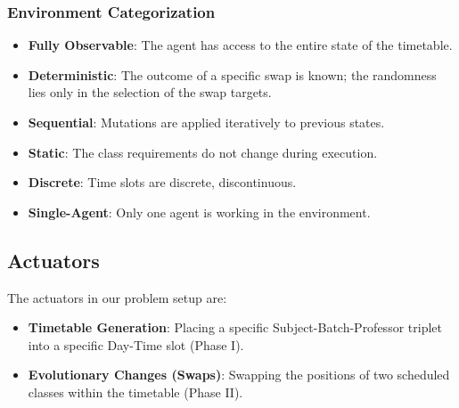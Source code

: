\documentclass[a4paper,twoside,11pt]{article}
\begin{document}
            \subsubsection{Environment Categorization}

                \begin{itemize}
                    \itemsep0em
                    \item \textbf{Fully Observable}: The agent has access to the entire state of the timetable.
                    \item \textbf{Deterministic}: The outcome of a specific swap is known; the randomness lies only in the selection of the swap targets.
                    \item \textbf{Sequential}: Mutations are applied iteratively to previous states.
                    \item \textbf{Static}: The class requirements do not change during execution.
                    \item \textbf{Discrete}: Time slots are discrete, discontinuous.
                    \item \textbf{Single-Agent}: Only one agent is working in the environment.
                \end{itemize}

        \subsection{Actuators}
            The actuators in our problem setup are:
            \begin{itemize}
                \itemsep0em
                \item \textbf{Timetable Generation}: Placing a specific Subject-Batch-Professor triplet into a specific Day-Time slot (Phase I).
                \item \textbf{Evolutionary Changes (Swaps)}: Swapping the positions of two scheduled classes within the timetable (Phase II).
            \end{itemize}
\end{document}

